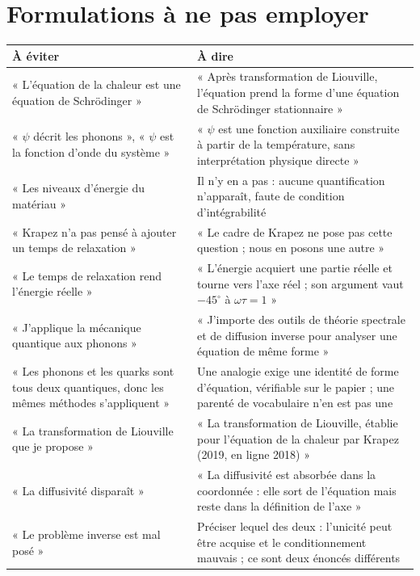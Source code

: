 \documentclass[11pt,a4paper]{article}
\begin{document}
\newpage
\section{Formulations à ne pas employer}

\begin{center}
\begin{tabularx}{\textwidth}{@{}XX@{}}
\toprule
\textbf{À éviter} & \textbf{À dire} \\
\midrule
« L'équation de la chaleur est une équation de Schrödinger »
& « Après transformation de Liouville, l'équation prend la forme d'une équation de Schrödinger
stationnaire » \\
\addlinespace
« $\psi$ décrit les phonons », « $\psi$ est la fonction d'onde du système »
& « $\psi$ est une fonction auxiliaire construite à partir de la température, sans interprétation
physique directe » \\
\addlinespace
« Les niveaux d'énergie du matériau »
& Il n'y en a pas : aucune quantification n'apparaît, faute de condition d'intégrabilité \\
\addlinespace
« Krapez n'a pas pensé à ajouter un temps de relaxation »
& « Le cadre de Krapez ne pose pas cette question ; nous en posons une autre » \\
\addlinespace
« Le temps de relaxation rend l'énergie réelle »
& « L'énergie acquiert une partie réelle et tourne vers l'axe réel ; son argument vaut $-45^{\circ}$ à
$\omega\tau = 1$ » \\
\addlinespace
« J'applique la mécanique quantique aux phonons »
& « J'importe des outils de théorie spectrale et de diffusion inverse pour analyser une équation de
même forme » \\
\addlinespace
« Les phonons et les quarks sont tous deux quantiques, donc les mêmes méthodes s'appliquent »
& Une analogie exige une identité de forme d'équation, vérifiable sur le papier ; une parenté de
vocabulaire n'en est pas une \\
\addlinespace
« La transformation de Liouville que je propose »
& « La transformation de Liouville, établie pour l'équation de la chaleur par Krapez (2019, en ligne 2018) » \\
\addlinespace
« La diffusivité disparaît »
& « La diffusivité est absorbée dans la coordonnée : elle sort de l'équation mais reste dans la
définition de l'axe » \\
\addlinespace
« Le problème inverse est mal posé »
& Préciser lequel des deux : l'unicité peut être acquise et le conditionnement mauvais ; ce sont deux
énoncés différents \\
\bottomrule
\end{tabularx}
\end{center}
\end{document}
